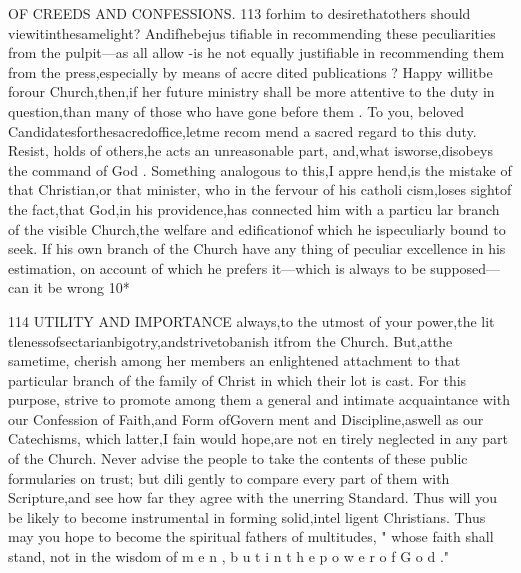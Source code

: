 \documentclass[
]{book}
\begin{document}
OF CREEDS AND CONFESSIONS. 113
forhim to desirethatothers should
viewitinthesamelight? Andifhebejus tifiable in recommending these peculiarities
from the pulpit---as all allow -is he not
equally justifiable in recommending them from the press,especially by means of accre dited publications ?
Happy willitbe forour Church,then,if her future ministry shall be more attentive to the duty in question,than many of those who have gone before them . To you, beloved Candidatesforthesacredoffice,letme recom mend a sacred regard to this duty. Resist,
holds of others,he acts an unreasonable part,
and,what isworse,disobeys the command of God . Something analogous to this,I appre hend,is the mistake of that Christian,or that minister, who in the fervour of his catholi cism,loses sightof the fact,that God,in his providence,has connected him with a particu lar branch of the visible Church,the welfare and edificationof which he ispeculiarly bound to seek. If his own branch of the Church have any thing of peculiar excellence in his estimation, on account of which he prefers it---which is always to be supposed--- can it
be
wrong
10*

114 UTILITY AND IMPORTANCE
always,to the utmost of your power,the lit tlenessofsectarianbigotry,andstrivetobanish itfrom the Church. But,atthe sametime,
cherish among her members an enlightened attachment to that particular branch of the family of Christ in which their lot is cast. For this purpose, strive to promote among
them a general and intimate acquaintance with our Confession of Faith,and Form ofGovern
ment and Discipline,aswell as our Catechisms, which latter,I fain would hope,are not en tirely neglected in any part of the Church. Never advise the people to take the contents of these public formularies on trust; but dili gently to compare every part of them with Scripture,and see how far they agree with the unerring Standard. Thus will you be likely to become instrumental in forming solid,intel ligent Christians. Thus may you hope to become the spiritual fathers of multitudes, " whose faith shall stand, not in the wisdom of m e n , b u t i n t h e p o w e r o f G o d ."
\end{document}
